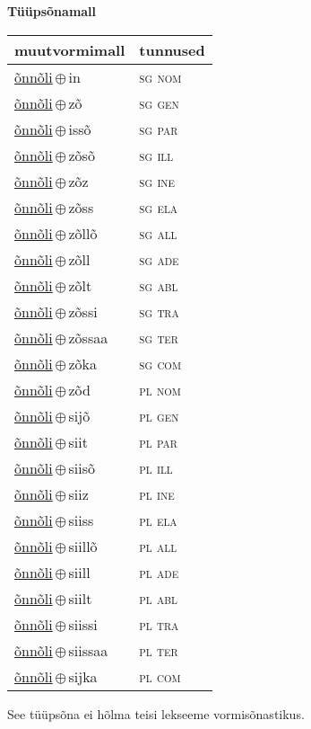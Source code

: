

\vspace{3.5em}
\noindent \begin{minipage}{\textwidth}
\noindent \textbf{Tüüpsõnamall \,}\\

\begin{sideways}
\begin{tabular}{l l}
muutvormimall & tunnused \\
\hline
\underline{õnnõli}\,$\oplus$\,in & \textsc{ sg nom } \\
\underline{õnnõli}\,$\oplus$\,zõ & \textsc{ sg gen } \\
\underline{õnnõli}\,$\oplus$\,issõ & \textsc{ sg par } \\
\underline{õnnõli}\,$\oplus$\,zõsõ & \textsc{ sg ill } \\
\underline{õnnõli}\,$\oplus$\,zõz & \textsc{ sg ine } \\
\underline{õnnõli}\,$\oplus$\,zõss & \textsc{ sg ela } \\
\underline{õnnõli}\,$\oplus$\,zõllõ & \textsc{ sg all } \\
\underline{õnnõli}\,$\oplus$\,zõll & \textsc{ sg ade } \\
\underline{õnnõli}\,$\oplus$\,zõlt & \textsc{ sg abl } \\
\underline{õnnõli}\,$\oplus$\,zõssi & \textsc{ sg tra } \\
\underline{õnnõli}\,$\oplus$\,zõssaa & \textsc{ sg ter } \\
\underline{õnnõli}\,$\oplus$\,zõka & \textsc{ sg com } \\
\underline{õnnõli}\,$\oplus$\,zõd & \textsc{ pl nom } \\
\underline{õnnõli}\,$\oplus$\,sijõ & \textsc{ pl gen } \\
\underline{õnnõli}\,$\oplus$\,siit & \textsc{ pl par } \\
\underline{õnnõli}\,$\oplus$\,siisõ & \textsc{ pl ill } \\
\underline{õnnõli}\,$\oplus$\,siiz & \textsc{ pl ine } \\
\underline{õnnõli}\,$\oplus$\,siiss & \textsc{ pl ela } \\
\underline{õnnõli}\,$\oplus$\,siillõ & \textsc{ pl all } \\
\underline{õnnõli}\,$\oplus$\,siill & \textsc{ pl ade } \\
\underline{õnnõli}\,$\oplus$\,siilt & \textsc{ pl abl } \\
\underline{õnnõli}\,$\oplus$\,siissi & \textsc{ pl tra } \\
\underline{õnnõli}\,$\oplus$\,siissaa & \textsc{ pl ter } \\
\underline{õnnõli}\,$\oplus$\,sijka & \textsc{ pl com } \\
\end{tabular}
\end{sideways}
\label{tab:tüüpsõnamall-õnnõliin}

\end{minipage}

 
\vspace{1em}
\noindent See tüüpsõna ei hõlma teisi lekseeme vormi\-sõnastikus.
